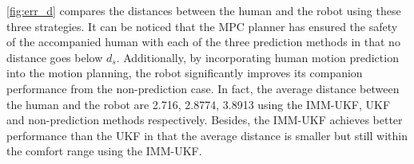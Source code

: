 \documentclass[letterpaper, 10 pt, conference]{ieeeconf}
\begin{document}
	\cref{fig:err_d} compares the distances between the human and the robot using these three strategies.
	It can be noticed that the MPC planner has ensured the safety of the accompanied human with each of the three prediction methods in that no distance goes below $d_s$.
	Additionally, by incorporating human motion prediction into the motion planning, the robot significantly improves its companion performance from the non-prediction case.
	In fact, the average distance between the human and the robot are 2.716, 2.8774, 3.8913 using the IMM-UKF, UKF and non-prediction methods respectively.
	Besides, the IMM-UKF achieves better performance than the UKF in that the average distance is smaller but still within the comfort range using the IMM-UKF.
\end{document}
